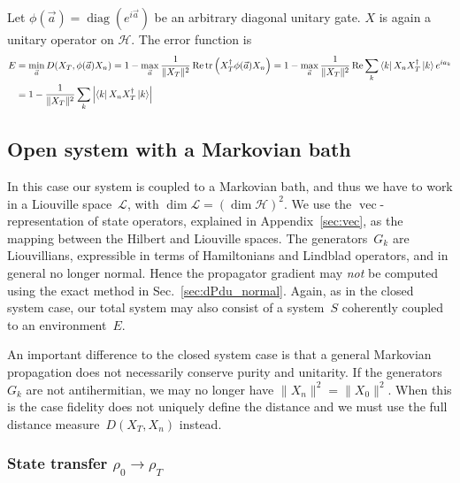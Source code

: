 \documentclass[aps, pra, a4paper, longbibliography, superscriptaddress]{revtex4-1}
\newcommand{\I}{\openone}
\newcommand{\be}{\begin{equation}}
\newcommand{\ee}{\end{equation}}
\newcommand{\eq}{\Leftrightarrow}
\newcommand{\ket}[1]{\left| #1 \right \rangle}
\newcommand{\bra}[1]{\left \langle #1 \right|}
\newcommand{\hilb}[1]{\mathcal{#1}}
\DeclareMathOperator{\tr}{tr}
\DeclareMathOperator{\re}{Re}
\DeclareMathOperator{\cvec}{vec}
\DeclareMathOperator{\diag}{diag}
\newcommand{\Xt}{X_T}  %
\newcommand{\Xo}{X_0}  %
\newcommand{\Xn}{X_n}  %
\begin{document}
Let $\phi(\vec{a}) = \diag(e^{i \vec{a}})$ be an arbitrary diagonal unitary gate.
$X$ is again a unitary operator on $\hilb{H}$.
The error function is
\begin{align}
\notag
E
&=
\min_{\vec{a}} D(\Xt, \phi(\vec{a}) \Xn)
=
1-\max_{\vec{a}} \frac{1}{\|\Xt\|^2} \re \tr\left(\Xt^\dagger \phi(\vec{a}) \Xn\right)
=
1-\max_{\vec{a}} \frac{1}{\|\Xt\|^2} \re \sum_k \bra{k} \Xn \Xt^\dagger \ket{k} e^{i a_k}\\
&=
1-\frac{1}{\|\Xt\|^2} \sum_k \left|\bra{k} \Xn \Xt^\dagger \ket{k}\right|
\end{align}



\subsection{Open system with a Markovian bath}

In this case our system is coupled to a Markovian bath, and thus
we have to work in a Liouville space~$\hilb{L}$,
with $\dim \hilb{L} = (\dim \hilb{H})^2$.
We use the $\cvec$-representation of state
operators, explained in Appendix~\ref{sec:vec},
as the mapping between the Hilbert and Liouville spaces.
The generators~$G_k$ are Liouvillians, expressible in terms of
Hamiltonians and Lindblad operators, and in general no longer normal.
Hence the propagator gradient may \emph{not} be computed using the exact
method in Sec.~\ref{sec:dPdu_normal}.
Again, as in the closed system case, our total system may also consist of
a system~$S$ coherently coupled to an environment~$E$.

An important difference to the closed system case is that a general Markovian propagation
does not necessarily conserve purity and unitarity.
If the generators~$G_k$ are not antihermitian, we may no longer have
$\|\Xn\|^2 = \|\Xo\|^2$. When this is the case
fidelity does not uniquely define the distance and we must use the
full distance measure~$D(\Xt,\Xn)$ instead.



\subsubsection{State transfer $\rho_0 \to \rho_T$}
\end{document}
